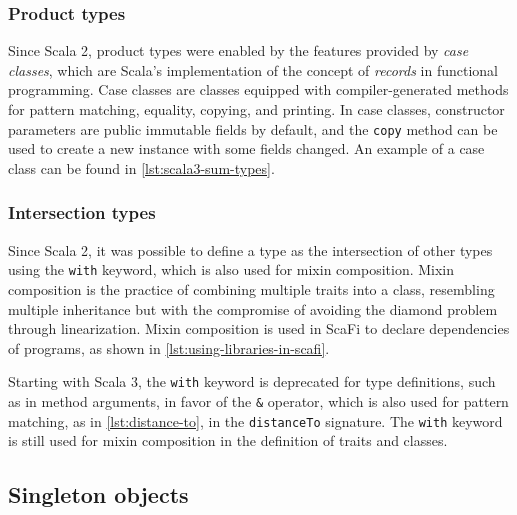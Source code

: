 

\subsubsection{Product types}

Since Scala 2, product types were enabled by the features provided by \textit{case classes}, which are Scala's implementation of the concept of \textit{records} in functional programming.
%
Case classes are classes equipped with compiler-generated methods for pattern matching, equality, copying, and printing.
%
In case classes, constructor parameters are public immutable fields by default, and the \texttt{copy} method can be used to create a new instance with some fields changed.
%
An example of a case class can be found in \cref{lst:scala3-sum-types}.

\subsubsection{Intersection types}

Since Scala 2, it was possible to define a type as the intersection of other types using the \texttt{with} keyword, which is also used for mixin composition.
%
Mixin composition is the practice of combining multiple traits into a class, resembling multiple inheritance but with the compromise of avoiding the diamond problem through linearization\cite{scala-patterns}.
%
Mixin composition is used in ScaFi to declare dependencies of programs, as shown in \cref{lst:using-libraries-in-scafi}.

Starting with Scala 3, the \texttt{with} keyword is deprecated for type definitions, such as in method arguments, in favor of the \texttt{\&} operator, which is also used for pattern matching, as in \cref{lst:distance-to}, in the \texttt{distanceTo} signature.
%
The \texttt{with} keyword is still used for mixin composition in the definition of traits and classes.


\subsection{Singleton objects} \label{chap:background->sec:scala3->subsec:singleton-objects}

